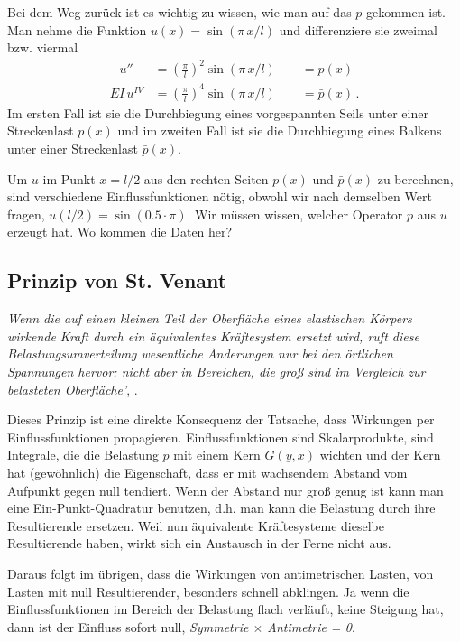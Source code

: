 Bei dem Weg zur\"{u}ck ist es wichtig zu wissen, wie man auf das $p$ gekommen ist. Man nehme die Funktion $u(x) = \sin (\pi\,x/l)$ und differenziere sie zweimal bzw. viermal
\begin{align}
- u'' &= (\frac{\pi}{l})^2 \sin (\pi\,x/l)  \qquad = p(x)\,\\
EI\,u^{IV} &= (\frac{\pi}{l})^4 \sin (\pi\,x/l) \qquad =\bar{p}(x)\,.
\end{align}
Im ersten Fall ist sie die Durchbiegung eines vorgespannten Seils unter einer Streckenlast $p(x)$ und im zweiten Fall ist sie die Durchbiegung eines Balkens unter einer Streckenlast $\bar{p}(x)$.

Um $u$ im Punkt $x = l/2$ aus den rechten Seiten $p(x)$ und $\bar{p}(x)$ zu berechnen, sind verschiedene Einflussfunktionen n\"{o}tig, obwohl wir nach demselben Wert fragen, $u(l/2) = \sin (0.5 \cdot \pi)$. Wir m\"{u}ssen wissen, welcher Operator $p$ aus $u$ erzeugt hat. Wo kommen die Daten her?


{\textcolor{sectionTitleBlue}{\section{Prinzip von St. Venant}}}
{\em \glq Wenn die auf einen kleinen Teil der Oberfl\"{a}che eines elastischen K\"{o}rpers wirkende Kraft durch ein \"{a}quivalentes Kr\"{a}ftesystem ersetzt wird, ruft diese Belastungsumverteilung wesentliche \"{A}nderungen nur bei den \"{o}rtlichen Spannungen hervor: nicht aber in Bereichen, die gro{\ss} sind im Vergleich zur belasteten Oberfl\"{a}che'\/}, \cite{Wiki1}.

Dieses Prinzip ist eine direkte Konsequenz der Tatsache, dass Wirkungen per Einflussfunktionen propagieren. Einflussfunktionen sind Skalarprodukte, sind Integrale, die die Belastung $p$ mit einem Kern $G(y,x)$ wichten und der Kern hat (gew\"{o}hnlich) die Eigenschaft, dass er mit wachsendem Abstand vom Aufpunkt gegen null tendiert. Wenn der Abstand nur gro{\ss} genug ist kann man eine Ein-Punkt-Quadratur benutzen, d.h. man kann die Belastung durch ihre Resultierende ersetzen. Weil nun \"{a}quivalente Kr\"{a}ftesysteme dieselbe Resultierende haben, wirkt sich ein Austausch in der Ferne nicht aus.

Daraus folgt im \"{u}brigen, dass die Wirkungen von antimetrischen Lasten, von Lasten mit null Resultierender, besonders schnell abklingen. Ja wenn die Einflussfunktionen im Bereich der Belastung \glq flach\grq{} verl\"{a}uft, keine Steigung hat, dann ist der Einfluss sofort null, {\em Symmetrie $\times$ Antimetrie = 0\/}. \\

